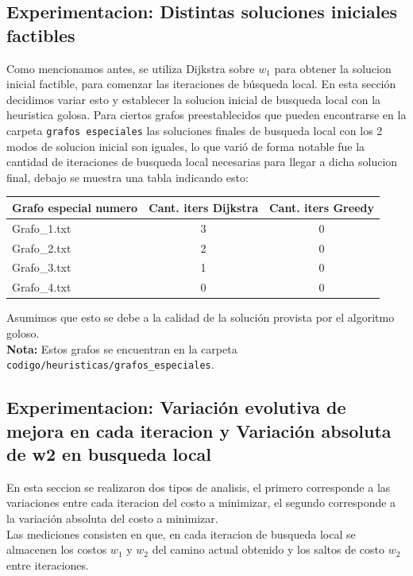 \subsection{Experimentacion: Distintas soluciones iniciales factibles}
Como mencionamos antes, se utiliza Dijkstra sobre $w_1$ para obtener la solucion inicial factible, para comenzar las iteraciones de b\'usqueda local. En esta secci\'on decidimos variar esto y establecer la solucion inicial de busqueda local con la heuristica golosa. Para ciertos grafos preestablecidos que pueden encontrarse en la carpeta \texttt{grafos especiales} las soluciones finales de busqueda local con los 2 modos de solucion inicial son iguales, lo que vari\'o de forma notable fue la cantidad de iteraciones de busqueda local necesarias para llegar a dicha solucion final, debajo se muestra una tabla indicando esto:
\begin{center}
	\begin{tabular}{ | l | c | c |}
	  \hline
	  Grafo especial numero & Cant. iters Dijkstra & Cant. iters Greedy \\
	  \hline
	  Grafo\_1.txt & 3 & 0 \\
	  \hline
	  Grafo\_2.txt & 2 & 0 \\
	  \hline
	  Grafo\_3.txt & 1 & 0 \\
	  \hline
	  Grafo\_4.txt & 0 & 0 \\
	  \hline
	\end{tabular}
\end{center}
Asumimos que esto se debe a la calidad de la soluci\'on provista por el algoritmo goloso.\\
\textbf{Nota:} Estos grafos se encuentran en la carpeta \texttt{codigo/heuristicas/grafos\_especiales}.

\subsection{Experimentacion: Variaci\'on evolutiva de mejora en cada iteracion y Variaci\'on absoluta de w2 en busqueda local}
En esta seccion se realizaron dos tipos de analisis, el primero corresponde a las variaciones entre cada iteracion del costo a minimizar, el segundo corresponde a la variaci\'on absoluta del costo a minimizar.\\

Las mediciones consisten en que, en cada iteracion de busqueda local se almacenen los costos $w_1$ y $w_2$ del camino actual obtenido y los saltos de costo $w_2$ entre iteraciones.\\

